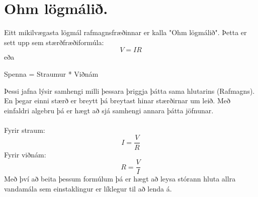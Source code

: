 \section{Ohm lögmálið.}
Eitt mikilvægasta lögmál rafmagnsfræðinnar er kalla "Ohm lögmálið". Þetta er sett upp sem stærðfræðiformúla:
\begin{equation}
V=IR
\end{equation} eða \\ 
\begin{center} Spenna = Straumur * Viðnám \end{center}
Þessi jafna lýsir samhengi milli þessara þriggja þátta sama hlutarins (Rafmagns). En þegar einni stærð er breytt þá breytast hinar stærðirnar um leið.
Með einfaldri algebru þá er hægt að sjá samhengi annara þátta jöfnunar. \\ \\
Fyrir straum:
\begin{equation}
I=\frac{V}{R}
\end{equation}
Fyrir viðnám:
\begin{equation}
R=\frac{V}{I}
\end{equation}
Með því að beita þessum formúlum þá er hægt að leysa stórann hluta allra vandamála sem einstaklingur er líklegur til að lenda á. \\ \\

